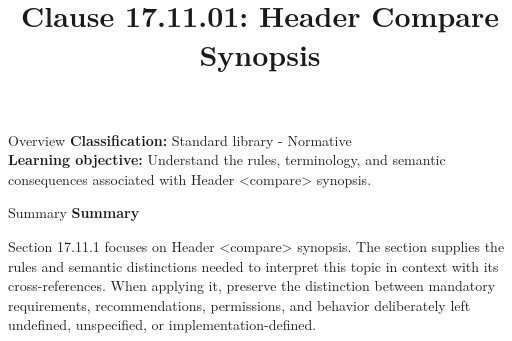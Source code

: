 \documentclass[10pt,letterpaper]{article}
\title{Clause 17.11.01: Header Compare Synopsis}
\author{}
\date{}
\begin{document}
\maketitle
\begin{CornellOverviewBox}{Overview}
\textbf{Classification:} Standard library - Normative\\[2pt]
\textbf{Learning objective:} Understand the rules, terminology, and semantic consequences associated with Header <compare> synopsis.
\end{CornellOverviewBox}\begin{CornellSummaryBox}{Summary}
{\sffamily\bfseries\color{Accent} Summary}\par\vspace{3pt}Section 17.11.1 focuses on Header <compare> synopsis. The section supplies the rules and semantic distinctions needed to interpret this topic in context with its cross-references. When applying it, preserve the distinction between mandatory requirements, recommendations, permissions, and behavior deliberately left undefined, unspecified, or implementation-defined.
\end{CornellSummaryBox}
\end{document}
